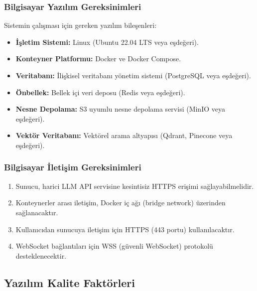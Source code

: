 \documentclass[12pt, a4paper]{article}
\begin{document}
\subsubsection{Bilgisayar Yazılım Gereksinimleri}

Sistemin çalışması için gereken yazılım bileşenleri:
\begin{itemize}[leftmargin=2cm]
    \item \textbf{İşletim Sistemi:} Linux (Ubuntu 22.04 LTS veya eşdeğeri).
    \item \textbf{Konteyner Platformu:} Docker ve Docker Compose.
    \item \textbf{Veritabanı:} İlişkisel veritabanı yönetim sistemi (PostgreSQL veya eşdeğeri).
    \item \textbf{Önbellek:} Bellek içi veri deposu (Redis veya eşdeğeri).
    \item \textbf{Nesne Depolama:} S3 uyumlu nesne depolama servisi (MinIO veya eşdeğeri).
    \item \textbf{Vektör Veritabanı:} Vektörel arama altyapısı (Qdrant, Pinecone veya eşdeğeri).
\end{itemize}

\subsubsection{Bilgisayar İletişim Gereksinimleri}

\begin{enumerate}[leftmargin=2cm]
    \item Sunucu, harici LLM API servisine kesintisiz HTTPS erişimi sağlayabilmelidir.
    \item Konteynerler arası iletişim, Docker iç ağı (bridge network) üzerinden sağlanacaktır.
    \item Kullanıcıdan sunucuya iletişim için HTTPS (443 portu) kullanılacaktır.
    \item WebSocket bağlantıları için WSS (güvenli WebSocket) protokolü desteklenecektir.
\end{enumerate}

\subsection{Yazılım Kalite Faktörleri}
\end{document}
